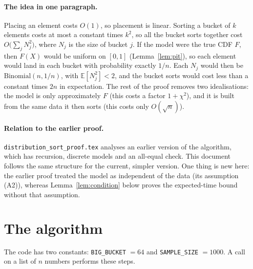 \documentclass[11pt]{article}
\theoremstyle{definition}
\theoremstyle{remark}
\newcommand{\E}{\mathbb{E}}
\newcommand{\code}[1]{\texttt{#1}}
\begin{document}
\paragraph{The idea in one paragraph.} Placing an element costs $O(1)$, so
placement is linear. Sorting a bucket of $k$ elements costs at most a
constant times $k^2$, so all the bucket sorts together cost
$O\bigl(\sum_j N_j^2\bigr)$, where $N_j$ is the size of bucket $j$. If the
model were the true CDF $F$, then $F(X)$ would be uniform on $[0,1]$
(Lemma~\ref{lem:pit}), so each element would land in each bucket with
probability exactly $1/n$. Each $N_j$ would then be
$\mathrm{Binomial}(n,1/n)$, with $\E[N_j^2]<2$, and the bucket sorts would
cost less than a constant times $2n$ in expectation. The rest of the proof
removes two idealisations: the model is only approximately $F$ (this costs
a factor $1+\chi^2$), and it is built from the same data it then sorts
(this costs only $O(\sqrt n)$).

\paragraph{Relation to the earlier proof.} \code{distribution\_sort\_proof.tex}
analyses an earlier version of the algorithm, which has recursion,
discrete models and an all-equal check. This document follows the same
structure for the current, simpler version. One thing is new here: the
earlier proof treated the model as independent of the data (its
assumption (A2)), whereas Lemma~\ref{lem:condition} below proves the
expected-time bound without that assumption.

\section{The algorithm}\label{sec:alg}

The code has two constants: \code{BIG\_BUCKET} $=64$ and
\code{SAMPLE\_SIZE} $=1000$. A call on a list of $n$ numbers performs these
steps.
\end{document}
